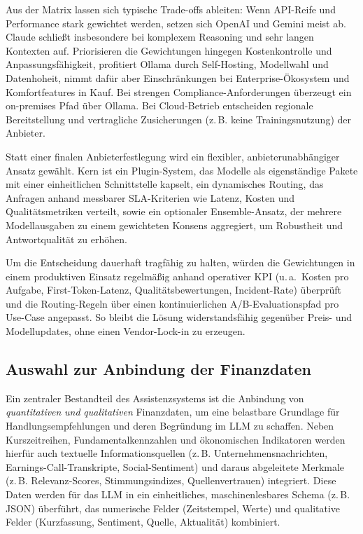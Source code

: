       Aus der Matrix lassen sich typische Trade-offs ableiten: Wenn \acs{API}-Reife und Performance stark gewichtet werden, setzen sich OpenAI und Gemini meist ab.
      Claude schließt insbesondere bei komplexem Reasoning und sehr langen Kontexten auf.
      Priorisieren die Gewichtungen hingegen Kostenkontrolle und Anpassungsfähigkeit, profitiert Ollama durch Self-Hosting, Modellwahl und Datenhoheit, nimmt dafür aber Einschränkungen bei Enterprise-Ökosystem und Komfortfeatures in Kauf.
      Bei strengen Compliance-Anforderungen überzeugt ein on-premises Pfad über Ollama.
      Bei Cloud-Betrieb entscheiden regionale Bereitstellung und vertragliche Zusicherungen (z.\,B. keine Trainingsnutzung) der Anbieter.

      Statt einer finalen Anbieterfestlegung wird ein flexibler, anbieterunabhängiger Ansatz gewählt.
      Kern ist ein Plugin-System, das Modelle als eigenständige Pakete mit einer einheitlichen Schnittstelle kapselt, ein dynamisches Routing, das Anfragen anhand messbarer SLA-Kriterien wie Latenz, Kosten und Qualitätsmetriken verteilt, sowie ein optionaler Ensemble-Ansatz, der mehrere Modellausgaben zu einem gewichteten Konsens aggregiert, um Robustheit und Antwortqualität zu erhöhen.

      Um die Entscheidung dauerhaft tragfähig zu halten, würden die Gewichtungen in einem produktiven Einsatz regelmäßig anhand operativer KPI (u.\,a.\ Kosten pro Aufgabe, First-Token-Latenz, Qualitätsbewertungen, Incident-Rate) überprüft und die Routing-Regeln über einen kontinuierlichen A/B-Evaluationspfad pro Use-Case angepasst.
      So bleibt die Lösung widerstandsfähig gegenüber Preis- und Modellupdates, ohne einen Vendor-Lock-in zu erzeugen.

  \subsection{Auswahl zur Anbindung der Finanzdaten}

    Ein zentraler Bestandteil des Assistenzsystems ist die Anbindung von \emph{quantitativen} \emph{und} \emph{qualitativen} Finanzdaten, um eine belastbare Grundlage für Handlungsempfehlungen und deren Begründung im \acs{LLM} zu schaffen. Neben Kurszeitreihen, Fundamentalkennzahlen und ökonomischen Indikatoren werden hierfür auch textuelle Informationsquellen (z.\,B. Unternehmensnachrichten, Earnings-Call-Transkripte, Social-Sentiment) und daraus abgeleitete Merkmale (z.\,B. Relevanz‐Scores, Stimmungsindizes, Quellenvertrauen) integriert.
    Diese Daten werden für das \acs{LLM} in ein einheitliches, maschinenlesbares Schema (z.\,B. \acs{JSON}) überführt, das numerische Felder (Zeitstempel, Werte) und qualitative Felder (Kurzfassung, Sentiment, Quelle, Aktualität) kombiniert.


